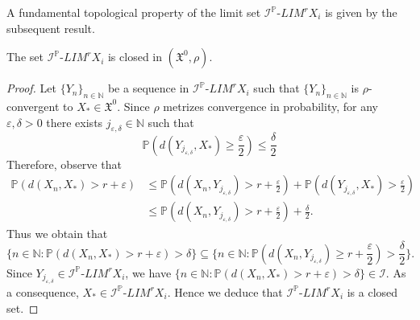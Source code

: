 \documentclass[reqno]{amsart}
\begin{document}
\let\thefootnote\relax{}
A fundamental topological property of the limit set $\mathcal{I}^{\mathbb{P}}$-$LIM^rX_i$ is given by the subsequent result.
\begin{theorem}
The set  $\mathcal{I}^{\mathbb{P}}$-$LIM^rX_i$ is closed in $(\mathfrak{X^0},\rho)$.
\end{theorem}
\begin{proof}
Let $\{Y_n\}_{n\in\mathbb{N}}$ be a sequence in $\mathcal{I}^{\mathbb{P}}$-$LIM^rX_i$ such that $\{Y_n\}_{n\in\mathbb{N}}$ is $\rho$-convergent to $X_*\in \mathfrak{X^0}$. Since $\rho$ metrizes convergence in probability, for any $\varepsilon,\delta>0$ there exists $j_{\varepsilon,\delta}\in\mathbb{N}$ such that 
\begin{equation*}
\mathbb{P}(d(Y_{j_{\varepsilon,\delta}},X_*)\geq \frac{\varepsilon}{2})\leq \frac{\delta}{2}
\end{equation*}
Therefore, observe that 
\begin{align*}
	\mathbb{P}(d(X_n,X_*)>r+\varepsilon)&\leq 	\mathbb{P}(d(X_n,Y_{j_{\varepsilon,\delta}})>r+\frac{\varepsilon}{2})+\mathbb{P}(d(Y_{j_{\varepsilon,\delta}},X_*)>\frac{\varepsilon}{2})\\
	&\leq \mathbb{P}(d(X_n,Y_{j_{\varepsilon,\delta}})>r+\frac{\varepsilon}{2})+\frac{\delta}{2}.
\end{align*}
Thus we obtain that $$\{n\in\mathbb{N}:\mathbb{P}(d(X_n,X_*)>r+\varepsilon)>\delta\}\subseteq \{n\in\mathbb{N}:\mathbb{P}(d(X_n,Y_{j_{\varepsilon,\delta}})\geq r+\frac{\varepsilon} {2})>\frac{\delta}{2}\}.$$
Since $Y_{j_{\varepsilon,\delta}}\in\mathcal{I}^{\mathbb{P}}$-$LIM^rX_i$, we have $\{n\in\mathbb{N}:\mathbb{P}(d(X_n,X_*)>r+\varepsilon)>\delta\}\in \mathcal{I}$. As a consequence, $X_*\in\mathcal{I}^{\mathbb{P}}$-$LIM^rX_i$. Hence we deduce that $\mathcal{I}^{\mathbb{P}}$-$LIM^rX_i$ is a closed set.
\end{proof}
\end{document}
